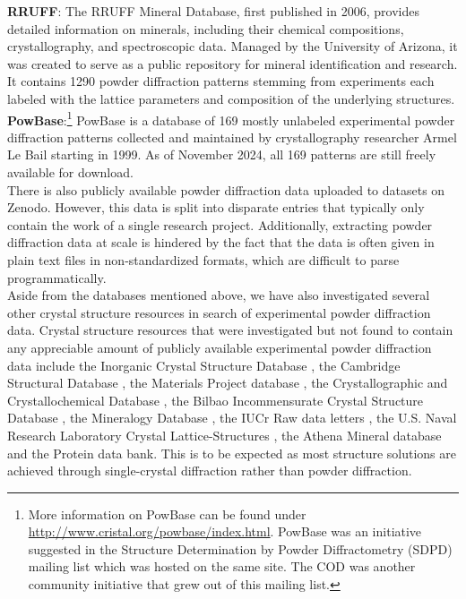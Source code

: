 \textbf{RRUFF}: \cite{RRUFFWeb} The RRUFF Mineral Database, first published in 2006, provides detailed information on minerals, including their chemical compositions, crystallography, and spectroscopic data. \cite{lafuente2015} Managed by the University of Arizona, it was created to serve as a public repository for mineral identification and research. It contains \num{1290} powder diffraction patterns stemming from experiments each labeled with the lattice parameters and composition of the underlying structures. \\

\textbf{PowBase}:\footnote{More information on PowBase can be found under \url{http://www.cristal.org/powbase/index.html}. PowBase was an initiative suggested in the Structure Determination by Powder Diffractometry (SDPD) mailing list which was hosted on the same site. The COD was another community initiative that grew out of this mailing list.} PowBase is a database of 169 mostly unlabeled experimental powder diffraction patterns collected and maintained by crystallography researcher Armel Le Bail starting in 1999. As of November 2024, all 169 patterns are still freely available for download. \\


There is also publicly available powder diffraction data uploaded to datasets on Zenodo. However, this data is split into disparate entries that typically only contain the work of a single research project. Additionally, extracting powder diffraction data at scale is hindered by the fact that the data is often given in plain text files in non-standardized formats, which are difficult to parse programmatically. \\

Aside from the databases mentioned above, we have also investigated several other crystal structure resources in search of experimental powder diffraction data. Crystal structure resources that were investigated but not found to contain any appreciable amount of publicly available experimental powder diffraction data include the Inorganic Crystal Structure Database \cite{ICSDWeb}, the Cambridge Structural Database \cite{CambridgeWeb}, the Materials Project database \cite{MatProjWeb}, the Crystallographic and Crystallochemical Database \cite{CrystallochemicalWeb}, the Bilbao Incommensurate Crystal Structure Database \cite{BilbaoWeb}, the Mineralogy Database \cite{MineralogyWeb}, the IUCr Raw data letters \cite{IUCrWeb}, the U.S. Naval Research Laboratory Crystal Lattice-Structures \cite{NRLWeb}, the Athena Mineral database \cite{AthenaWeb} and the Protein data bank\cite{PDBWeb}. This is to be expected as most structure solutions are achieved through single-crystal diffraction rather than powder diffraction. \\ 